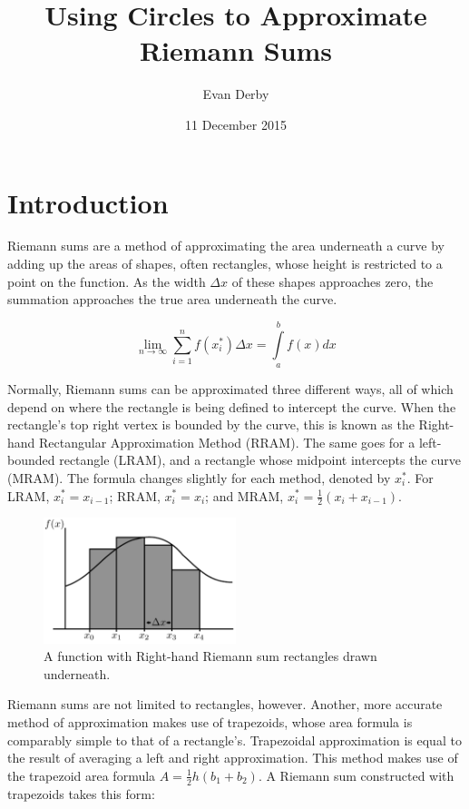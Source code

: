\documentclass{article}
\begin{document}
  \title{Using Circles to Approximate Riemann Sums}
  \author{Evan Derby}
  \date{11 December 2015}
  \maketitle

  \section{Introduction}
    Riemann sums are a method of approximating the area underneath a curve by adding up the areas of shapes, often rectangles, whose height is restricted to a point on the function. As the width \( \Delta x \) of these shapes approaches zero, the summation approaches the true area underneath the curve.

    \[ \displaystyle\lim_{n \to \infty}\sum_{i=1}^{n} f(x^*_i) \Delta x = \int\limits_a^b f(x)dx \]

    Normally, Riemann sums can be approximated three different ways, all of which depend on where the rectangle is being defined to intercept the curve. When the rectangle's top right vertex is bounded by the curve, this is known as the Right-hand Rectangular Approximation Method (RRAM). The same goes for a left-bounded rectangle (LRAM), and a rectangle whose midpoint intercepts the curve (MRAM). The formula changes slightly for each method, denoted by \( x^*_i \). For LRAM, \( x_i^* = x_{i-1} \); RRAM, \( x_i^* = x_i \); and MRAM, \( x_i^* = \frac{1}{2}(x_i + x_{i-1}) \).

    \begin{figure}[h]
      \centering
      \includegraphics[width=0.5\textwidth]{riemann_1}
      \caption{A function with Right-hand Riemann sum rectangles drawn underneath.}
    \end{figure}

    Riemann sums are not limited to rectangles, however. Another, more accurate method of approximation makes use of trapezoids, whose area formula is comparably simple to that of a rectangle's. Trapezoidal approximation is equal to the result of averaging a left and right approximation. This method makes use of the trapezoid area formula \( A = \frac{1}{2}h(b_1+b_2) \). A Riemann sum constructed with trapezoids takes this form:
\end{document}
